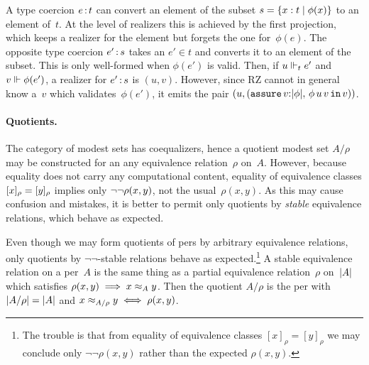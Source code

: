A type coercion $e\,{:}\,t$ can convert an element of the subset $s =
\{x : t \mid \phi(x)\}$ to an element of~$t$. At the level of
realizers this is achieved by the first projection, which keeps a
realizer for the element but forgets the one for~$\phi(e)$. The
opposite type coercion $e'\,{:}\,s$ takes an $e' \in t$ and converts it
to an element of the subset. This is only well-formed when $\phi(e')$
is valid. Then, if $u \Vdash_t e'$ and $v \Vdash \phi(e')$, a realizer for
$e'\,{:}\,s$ is $(u, v)$. However, since RZ cannot in general know
a~$v$ which validates~$\phi(e')$, it emits the pair $(u,
(\mathtt{assure}\,v{:}|\phi|,\,\phi\,u\,v\,\mathtt{in}\,v))$.

\paragraph{Quotients.}
%
\iflong
%
The category of modest sets has coequalizers, hence a quotient modest
set $A/\rho$ may be constructed for an any equivalence relation~$\rho$
on~$A$. However, because equality does not carry any computational
content, equality of equivalence classes $[x]_{\rho} =
[y]_{\rho}$ implies only $\lnot \lnot \rho(x,y)$, not the
usual~$\rho(x,y)$. As this may cause confusion
and mistakes, it is better to permit only quotients by \emph{stable}
equivalence relations, which behave as expected.

%
\else
%
Even though we may form quotients of pers by arbitrary equivalence
relations, only quotients by $\lnot\lnot$-stable relations behave as
expected.\footnote{The trouble is that from equality of equivalence
  classes $[x]_{\rho} = [y]_{\rho}$ we may conclude only
  $\lnot\lnot\rho(x,y)$ rather than the expected $\rho(x,y)$.}
%
\fi
A stable equivalence relation on a per~$A$ is the same thing as a
partial equivalence relation~$\rho$ on~$|A|$ which satisfies
$\rho(x,y) \implies x \approx_A y$. Then the quotient $A/\rho$ is the per
with $|A/\rho| = |A|$ and $x \approx_{A/\rho} y \iff
\rho(x,y)$.

